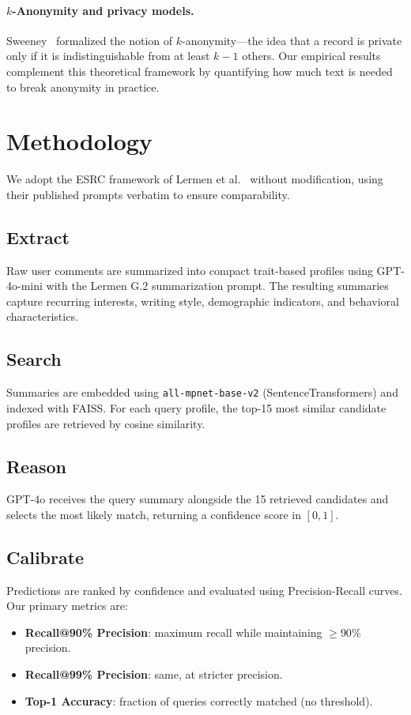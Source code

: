 \documentclass[sigplan,screen,nonacm]{acmart}
\begin{document}
\paragraph{$k$-Anonymity and privacy models.}
Sweeney~\cite{sweeney2002} formalized the notion of $k$-anonymity---the idea that
a record is private only if it is indistinguishable from at least $k-1$ others.
Our empirical results complement this theoretical framework by quantifying how
much text is needed to break anonymity in practice.


\section{Methodology}


We adopt the ESRC framework of Lermen et al.~\cite{lermen2026} without modification,
using their published prompts verbatim to ensure comparability.

\subsection{Extract}
Raw user comments are summarized into compact trait-based profiles using GPT-4o-mini
with the Lermen G.2 summarization prompt. The resulting summaries capture recurring
interests, writing style, demographic indicators, and behavioral characteristics.

\subsection{Search}
Summaries are embedded using \texttt{all-mpnet-base-v2} (SentenceTransformers) and
indexed with FAISS. For each query profile, the top-15 most similar candidate profiles
are retrieved by cosine similarity.

\subsection{Reason}
GPT-4o receives the query summary alongside the 15 retrieved candidates and selects
the most likely match, returning a confidence score in $[0, 1]$.

\subsection{Calibrate}
Predictions are ranked by confidence and evaluated using Precision-Recall curves.
Our primary metrics are:
\begin{itemize}
  \item \textbf{Recall@90\% Precision}: maximum recall while maintaining $\geq 90\%$ precision.
  \item \textbf{Recall@99\% Precision}: same, at stricter precision.
  \item \textbf{Top-1 Accuracy}: fraction of queries correctly matched (no threshold).
\end{itemize}
\end{document}
